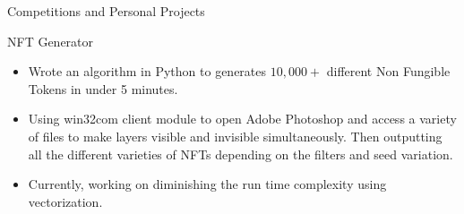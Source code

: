 \documentclass{article}
\newlength{\tabin}
\newlength{\secsep}
\newcommand{\lineunder}{\vspace*{-8pt} \\ \hspace*{-6pt} \hrulefill \\ \vspace*{-15pt}}
\newenvironment{tabbedsection}[1]{
  \begin{list}{}{
      \setlength{\itemsep}{0pt}
      \setlength{\labelsep}{0pt}
      \setlength{\labelwidth}{0pt}
      \setlength{\leftmargin}{\tabin}
      \setlength{\rightmargin}{\tabin}
      \setlength{\listparindent}{0pt}
      \setlength{\parsep}{0pt}
      \setlength{\parskip}{0pt}
      \setlength{\partopsep}{0pt}
      \setlength{\topsep}{#1}
    }
  \item[]
}{\end{list}}
\newenvironment{resume_section}[1]{
  \filbreak
  \vspace{2\secsep}
  \textsc{\large#1}
  \lineunder
  \begin{tabbedsection}{\secsep}
}{\end{tabbedsection}}
\newenvironment{resume_subsection}[2][]{
  \textbf{#2} \hfill {\footnotesize #1} \hspace{2em}
  \begin{tabbedsection}{0.5\secsep}
}{\end{tabbedsection}}
\newenvironment{subitems}{
  \renewcommand{\labelitemi}{-}
  \begin{itemize}
      \setlength{\labelsep}{1em}
}{\end{itemize}}
\begin{document}
\begin{resume_section}{Competitions and Personal Projects}
    \begin{resume_subsection}[(February 2022)]{NFT Generator}
        \begin{subitems}
        \item Wrote an algorithm in Python to generates $10,000+$ different Non Fungible Tokens in under 5 minutes.
        \item Using win32com client module to open Adobe Photoshop and access a variety of files to make layers visible and invisible simultaneously. Then outputting all the different varieties of NFTs depending on the filters and seed variation.
        \item Currently, working on diminishing the run time complexity using vectorization.
        \end{subitems}
    \end{resume_subsection}


\end{resume_section}
\end{document}
